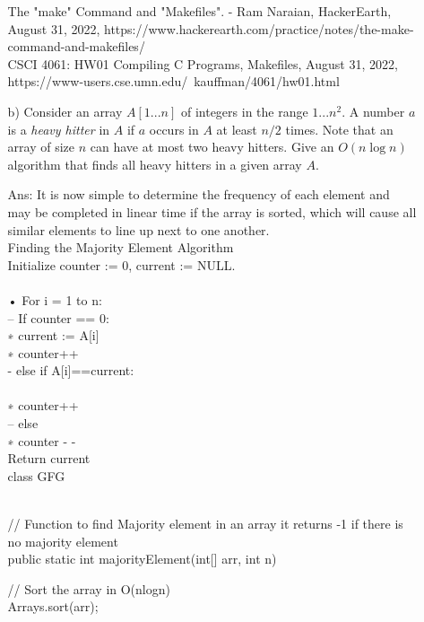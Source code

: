 \documentclass[10pt,letterpaper]{article}
\begin{document}
\begin{itemize}
\begin{itemize}
 The "make" Command and "Makefiles". - Ram Naraian, HackerEarth, August 31, 2022, https://www.hackerearth.com/practice/notes/the-make-command-and-makefiles/\\
CSCI 4061: HW01 Compiling C Programs, Makefiles, August 31, 2022, https://www-users.cse.umn.edu/~kauffman/4061/hw01.html\\

\item[b)] Consider an array $A[1...n]$ of integers in the range
  $1...n^2$. A number $a$ is a {\em heavy hitter} in $A$ if $a$ occurs
  in $A$ at least $n/2$ times.  Note that an array of size $n$ can
  have at most two heavy hitters. Give an $O(n\log n)$ algorithm that
  finds all heavy hitters in a given array $A$.
\item[Ans: ] It is now simple to determine the frequency of each element and may be completed in linear time if the array is sorted, which will cause all similar elements to line up next to one another.\\

Finding the Majority Element Algorithm\\
Initialize counter := 0, current := NULL.\\
[current stores the frontrunner for the majority element]\\
• For i = 1 to n:\\
– If counter == 0:\\
[In this case, there is no frontrunner.] 
∗ current := A[i]\\
∗ counter++\\
- else if A[i]==current:\\
[In this case, our confidence in the current frontrunner goes up.]\\
∗ counter++ \\
– else\\
[In this case, our confidence in the current frontrunner goes down.] 
∗ counter - -\\
Return current\\

class GFG{\\

// Function to find Majority element in an array it returns -1 if there is no majority element\\
public static int majorityElement(int[] arr, int n)\\
{
	
	// Sort the array in O(nlogn)\\
	Arrays.sort(arr);\\

}}
\end{itemize}
\end{itemize}
\end{document}
